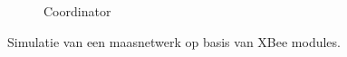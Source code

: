 \begin{figure}[ht]
\begin{subfigure}{.67\linewidth}
  \caption{Coordinator}
  \label{fig:virtual-mesh-coordinator}
\end{subfigure}
\caption{Simulatie van een maasnetwerk op basis van XBee modules.}
\label{fig:virtual-mesh-output}
\end{figure}
